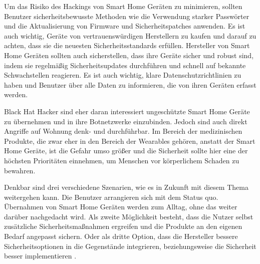 \documentclass[12pt, a4paper, onecolumn, oneside, toc=bibliographynumbered, liststotoc]{scrreprt} %
\begin{document}
 Um das Risiko des Hackings von Smart Home Geräten zu minimieren, sollten Benutzer sicherheitsbewusste Methoden wie die Verwendung starker Passwörter und die Aktualisierung von Firmware und Sicherheitspatches anwenden. Es ist auch wichtig, Geräte von vertrauenswürdigen Herstellern zu kaufen und darauf zu achten, dass sie die neuesten Sicherheitsstandards erfüllen.
 Hersteller von Smart Home Geräten sollten auch sicherstellen, dass ihre Geräte sicher und robust sind, indem sie regelmäßig Sicherheitsupdates durchführen und schnell auf bekannte Schwachstellen reagieren. Es ist auch wichtig, klare Datenschutzrichtlinien zu haben und Benutzer über alle Daten zu informieren, die von ihren Geräten erfasst werden.

 Black Hat Hacker sind eher daran interessiert ungeschützte Smart Home Geräte zu übernehmen und in ihre Botnetzwerke einzubinden. Jedoch sind auch direkt Angriffe auf Wohnung denk- und durchführbar. Im Bereich der medizinischen Produkte, die zwar eher in den Bereich der Wearables gehören, anstatt der Smart Home Geräte, ist die Gefahr umso größer und die Sicherheit sollte hier eine der höchsten Prioritäten einnehmen, um Menschen vor körperlichem Schaden zu bewahren.

 Denkbar sind drei verschiedene Szenarien, wie es in Zukunft mit diesem Thema weitergehen kann. Die Benutzer arrangieren sich mit dem Status quo. Übernahmen von Smart Home Geräten werden zum Alltag, ohne das weiter darüber nachgedacht wird. Als zweite Möglichkeit besteht, dass die Nutzer selbst zusätzliche Sicherheitsmaßnahmen ergreifen und die Produkte an den eigenen Bedarf angepasst sichern. Oder als dritte Option, dass die Hersteller bessere Sicherheitsoptionen in die Gegenstände integrieren, beziehungsweise die Sicherheit besser implementieren \parencite[6]{Chantzis.2021}.

\newpage %
\printbibliography* %
\appendix %
\end{document}
